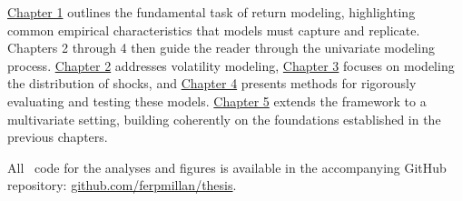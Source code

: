 \hyperref[chap:1]{Chapter 1} outlines the fundamental task of return modeling, highlighting common empirical characteristics that models must capture and replicate. Chapters 2 through 4 then guide the reader through the univariate modeling process. \hyperref[chap:2]{Chapter 2} addresses volatility modeling, \hyperref[chap:3]{Chapter 3} focuses on modeling the distribution of shocks, and \hyperref[chap:4]{Chapter 4} presents methods for rigorously evaluating and testing these models. \hyperref[chap:5]{Chapter 5} extends the framework to a multivariate setting, building coherently on the foundations established in the previous chapters.

All \Rlogo\ code for the analyses and figures is available in the accompanying GitHub repository: \href{https://github.com/ferpmillan/thesis}{github.com/ferpmillan/thesis}.